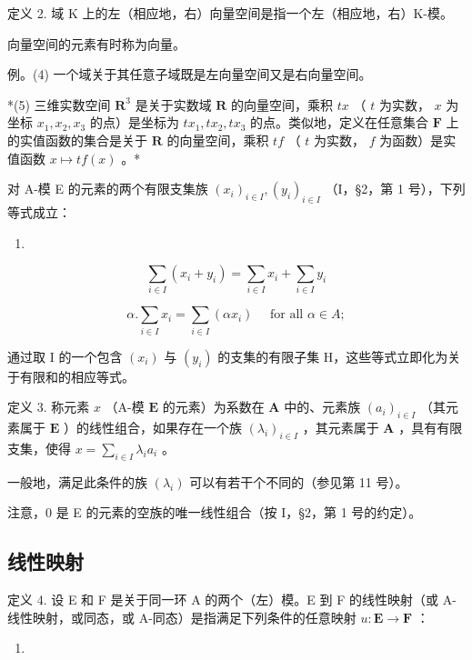 定义 2. 域 K 上的左（相应地，右）向量空间是指一个左（相应地，右）K-模。

向量空间的元素有时称为向量。

例。(4) 一个域关于其任意子域既是左向量空间又是右向量空间。

*(5) 三维实数空间 \(\mathbf{R}^3\) 是关于实数域 \(\mathbf{R}\) 的向量空间，乘积 \(tx\) （ \(t\) 为实数， \(x\) 为坐标 \(x_1, x_2, x_3\) 的点）是坐标为 \(tx_1, tx_2, tx_3\) 的点。类似地，定义在任意集合 \(\mathbf{F}\) 上的实值函数的集合是关于 \(\mathbf{R}\) 的向量空间，乘积 \(tf\) （ \(t\) 为实数， \(f\) 为函数）是实值函数 \(x \mapsto tf(x)\) 。*

对 A-模 E 的元素的两个有限支集族 \((x_{i})_{i\in I}, (y_{i})_{i\in I}\) （I，§2，第 1 号），下列等式成立：

\begin{enumerate}
\def\labelenumi{(\arabic{enumi})}
\tightlist
\item
\end{enumerate}

\[
\sum_ {i \in I} (x _ {i} + y _ {i}) = \sum_ {i \in I} x _ {i} + \sum_ {i \in I} y _ {i}\tag{2}
\]

\[
\alpha . \sum_ {i \in I} x _ {i} = \sum_ {i \in I} (\alpha x _ {i}) \quad \text { for   all } \alpha \in A;
\]

通过取 I 的一个包含 \((x_{i})\) 与 \((y_{i})\) 的支集的有限子集 H，这些等式立即化为关于有限和的相应等式。

定义 3. 称元素 \(x\) （A-模 \(\mathbf{E}\) 的元素）为系数在 \(\mathbf{A}\) 中的、元素族 \((a_{i})_{i\in I}\) （其元素属于 \(\mathbf{E}\) ）的线性组合，如果存在一个族 \((\lambda_{i})_{i\in I}\) ，其元素属于 \(\mathbf{A}\) ，具有有限支集，使得 \(x = \sum_{i\in I}\lambda_{i}a_{i}\) 。

一般地，满足此条件的族 \((\lambda_{i})\) 可以有若干个不同的（参见第 11 号）。

注意，0 是 E 的元素的空族的唯一线性组合（按 I，§2，第 1 号的约定）。

\subsection{线性映射}

定义 4. 设 E 和 F 是关于同一环 A 的两个（左）模。E 到 F 的线性映射（或 A-线性映射，或同态，或 A-同态）是指满足下列条件的任意映射 \(u: \mathbf{E} \to \mathbf{F}\) ：

\begin{enumerate}
\def\labelenumi{(\arabic{enumi})}
\setcounter{enumi}{2}
\tightlist
\item
\end{enumerate}

